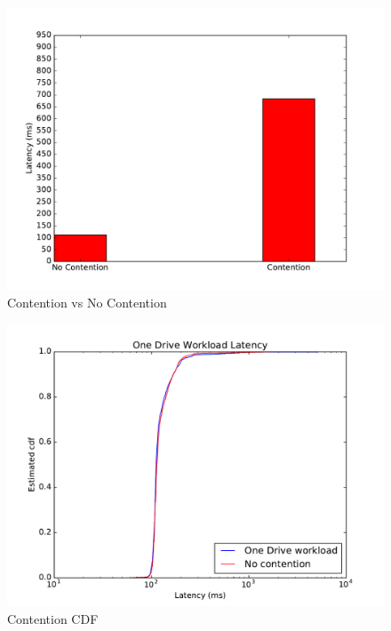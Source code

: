 \begin{figure}[t]
      \includegraphics[width=\linewidth]{images/Contention_bar}
      \caption{Contention vs No Contention}
      \label{fig:gizacontentionbar}
\end{figure}

\begin{figure}[t]
      \includegraphics[width=\linewidth]{images/Contention_cdf}
      \caption{Contention CDF}
      \label{fig:gizacontentioncdf}
\end{figure}
